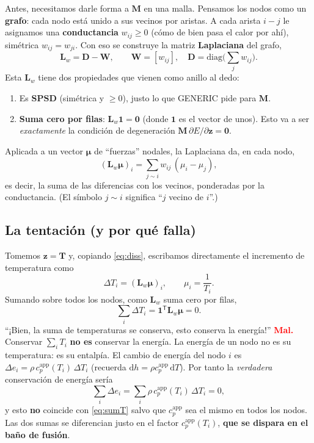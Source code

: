 \documentclass[11pt]{article}
\newcommand{\dd}{\mathrm{d}}
\newcommand{\cpapp}{c_p^{\mathrm{app}}}
\newcommand{\Lw}{\bm{L}_{w}}
\newcommand{\bmu}{\bm{\mu}}
\newcommand{\alert}[1]{\textcolor{red}{\textbf{#1}}}
\theoremstyle{definition}
\theoremstyle{plain}
\begin{document}
Antes, necesitamos darle forma a $\bm M$ en una malla. Pensamos los nodos como un
\textbf{grafo}: cada nodo está unido a sus vecinos por aristas. A cada arista
$i\!-\!j$ le asignamos una \textbf{conductancia} $w_{ij}\ge 0$ (cómo de bien pasa el
calor por ahí), simétrica $w_{ij}=w_{ji}$. Con eso se construye la matriz
\textbf{Laplaciana} del grafo,
\begin{equation}
  \Lw = \bm D - \bm W,\qquad
  \bm W=[w_{ij}],\quad \bm D=\mathrm{diag}\Big(\textstyle\sum_j w_{ij}\Big).
  \label{eq:laplacian}
\end{equation}
Esta $\Lw$ tiene dos propiedades que vienen como anillo al dedo:
\begin{enumerate}[leftmargin=1.5em]
  \item Es \textbf{SPSD} (simétrica y $\ge 0$), justo lo que GENERIC pide para
  $\bm M$.
  \item \textbf{Suma cero por filas}: $\Lw\bm 1=\bm 0$ (donde $\bm 1$ es el vector
  de unos). Esto va a ser \emph{exactamente} la condición de degeneración
  $\bm M\,\partial E/\partial\bm z=\bm0$.
\end{enumerate}
Aplicada a un vector $\bmu$ de ``fuerzas'' nodales, la Laplaciana da, en cada nodo,
\begin{equation}
  (\Lw\bmu)_i = \sum_{j\sim i} w_{ij}\,(\mu_i-\mu_j),
  \label{eq:lapaction}
\end{equation}
es decir, la suma de las diferencias con los vecinos, ponderadas por la
conductancia. (El símbolo $j\sim i$ significa ``$j$ vecino de $i$''.)

\subsection{La tentación (y por qué falla)}

Tomemos $\bm z=\bm T$ y, copiando \eqref{eq:diss}, escribamos directamente el
incremento de temperatura como
\begin{equation}
  \Delta T_i = (\Lw\bmu)_i,\qquad \mu_i=\frac{1}{T_i}.
  \label{eq:wrong}
\end{equation}
Sumando sobre todos los nodos, como $\Lw$ suma cero por filas,
\begin{equation}
  \sum_i \Delta T_i = \bm 1^{\mathsf T}\Lw\bmu = 0.
  \label{eq:sumT}
\end{equation}
``¡Bien, la suma de temperaturas se conserva, esto conserva la energía!'' \alert{Mal.}
Conservar $\sum_i T_i$ \textbf{no es} conservar la energía. La energía de un nodo no
es su temperatura: es su entalpía. El cambio de energía del nodo $i$ es
$\Delta e_i = \rho\,\cpapp(T_i)\,\Delta T_i$ (recuerda $\dd h=\rho\cpapp\,\dd T$).
Por tanto la \emph{verdadera} conservación de energía sería
\begin{equation}
  \sum_i \Delta e_i = \sum_i \rho\,\cpapp(T_i)\,\Delta T_i = 0,
  \label{eq:energytrue}
\end{equation}
y esto \textbf{no} coincide con \eqref{eq:sumT} salvo que $\cpapp$ sea el mismo en
todos los nodos. Las dos sumas se diferencian justo en el factor $\cpapp(T_i)$,
\textbf{que se dispara en el baño de fusión}.
\end{document}
